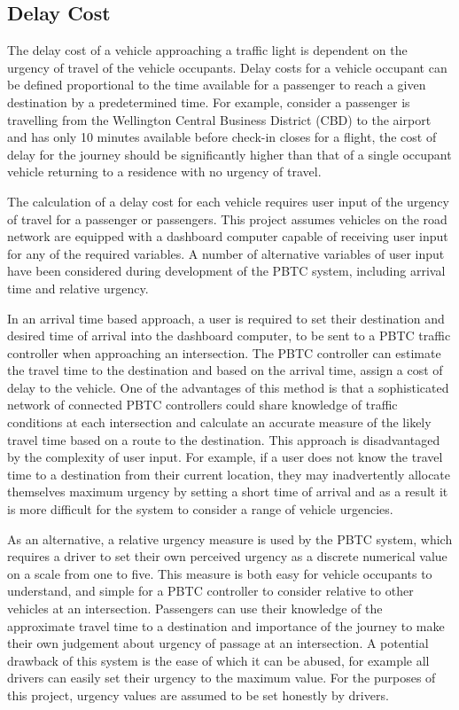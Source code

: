 \subsection{Delay Cost}
\label{sec:design_delay_cost}

The delay cost of a vehicle approaching a traffic light is dependent on the urgency of travel of the vehicle occupants. Delay costs for a vehicle occupant can be defined proportional to the time available for a passenger to reach a given destination by a predetermined time. For example, consider a passenger is travelling from the Wellington Central Business District (CBD) to the airport and has only 10 minutes available before check-in closes for a flight, the cost of delay for the journey should be significantly higher than that of a single occupant vehicle returning to a residence with no urgency of travel. 

The calculation of a delay cost for each vehicle requires user input of the urgency of travel for a passenger or passengers. This project assumes vehicles on the road network are equipped with a dashboard computer capable of receiving user input for any of the required variables. A number of alternative variables of user input have been considered during development of the PBTC system, including arrival time and relative urgency. 

In an arrival time based approach, a user is required to set their destination and desired time of arrival into the dashboard computer, to be sent to a PBTC traffic controller when approaching an intersection. The PBTC controller can estimate the travel time to the destination and based on the arrival time, assign a cost of delay to the vehicle. One of the advantages of this method is that a sophisticated network of connected PBTC controllers could share knowledge of traffic conditions at each intersection and calculate an accurate measure of the likely travel time based on a route to the destination. This approach is disadvantaged by the complexity of user input. For example, if a user does not know the travel time to a destination from their current location, they may inadvertently allocate themselves maximum urgency by setting a short time of arrival and as a result it is more difficult for the system to consider a range of vehicle urgencies.

As an alternative, a relative urgency measure is used by the PBTC system, which requires a driver to set their own perceived urgency as a discrete numerical value on a scale from one to five. This measure is both easy for vehicle occupants to understand, and simple for a PBTC controller to consider relative to other vehicles at an intersection. Passengers can use their knowledge of the approximate travel time to a destination and importance of the journey to make their own judgement about urgency of passage at an intersection. A potential drawback of this system is the ease of which it can be abused, for example all drivers can easily set their urgency to the maximum value. For the purposes of this project, urgency values are assumed to be set honestly by drivers.

